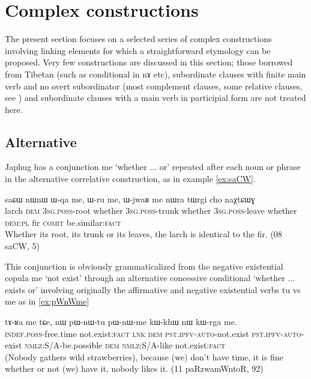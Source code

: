 \documentclass[oldfontcommands,oneside,a4paper,11pt]{article}
\newcommand{\ipa}[1]{\mbox{\phon #1}} %
\begin{document}
\section{Complex constructions} 
The present section focuses on a selected series of complex constructions involving linking elements for which a straightforward etymology can be proposed.  Very few constructions are discussed in this section; those borrowed from Tibetan (such as conditional in \ipa{nɤ} etc), subordinate clauses with finite main verb and no overt subordinator   (most complement clauses, some relative clauses, see \citealt{jacques16relatives}) and subordinate clauses with a main verb in participial form are not treated here.

\subsection{Alternative}
 Japhug has a conjunction \ipa{me}  `whether ... or' repeated after each noun or phrase in the alternative correlative construction, as in example \ref{ex:saCW}.
 
\begin{exe}
\ex \label{ex:saCW}
\gll  \ipa{saɕɯ} 	\ipa{nɯnɯ} 	\ipa{ɯ-qa} 	\ipa{me,} 	\ipa{ɯ-ru} 	\ipa{me,} 	\ipa{ɯ-jwaʁ} 	\ipa{me} 	\ipa{nɯra} 	\ipa{tɯrgi} 	\ipa{cho} 	\ipa{naχtɕɯɣ} \\
 larch \textsc{dem} \textsc{3sg.poss}-root whether \textsc{3sg.poss}-trunk whether \textsc{3sg.poss}-leave whether \textsc{dem:pl} fir  \textsc{comit} be.similar:\textsc{fact} \\
\glt Whether its root, its trunk or its leaves, the larch is identical to the fir. (08 saCW, 5)
\end{exe} 

This conjunction is obviously grammaticalized from the negative existential copula \ipa{me} `not exist' through an alternative  concessive conditional `whether ... exists or' involving originally the affirmative and negative existential verbs \ipa{tu} vs \ipa{me} as in \ref{ex:pWnWme}

\begin{exe}
\ex \label{ex:pWnWme}
\gll \ipa{tɤ-ʁa} 	\ipa{me} 	\ipa{tɕe,} 	\ipa{nɯ} 	\ipa{pɯ-nɯ-tu} 	\ipa{pɯ-nɯ-me} 	\ipa{kɯ-khɯ} 	\ipa{nɯ} 	\ipa{kɯ-rga} 	\ipa{me.} \\
\textsc{indef.poss}-free.time not.exist:\textsc{fact} \textsc{lnk} \textsc{dem} \textsc{pst.ipfv-auto}-not.exist \textsc{pst.ipfv-auto}-exist \textsc{nmlz}:S/A-be.possible \textsc{dem} \textsc{nmlz}:S/A-like not.exist:\textsc{fact} \\
\glt (Nobody gathers wild strawberries), because (we) don't have time, it is fine whether or not (we) have it, nobody likes it. (11 paRzwamWntoR, 92)
\end{exe}
 
\end{document}
